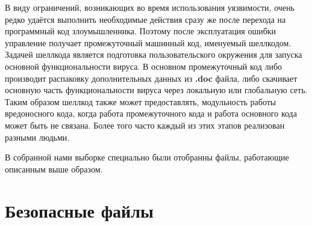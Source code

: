 В виду ограничений, возникающих во время использования уязвимости, очень редко удаётся выполнить необходимые действия сразу же после перехода на программный код злоумышленника.
Поэтому после эксплуатация ошибки управление получает промежуточный машинный код, именуемый шеллкодом.
Задачей шеллкода является подготовка пользовательского окружения для запуска основной функциональности вируса.
В основном промежуточный код либо производит распаковку дополнительных данных из \textbf{.doc} файла, либо скачивает основную часть функциональности вируса через локальную или глобальную сеть.
Таким образом шеллкод также может предоставлять, модульность работы вредоносного кода, когда работа промежуточного кода и работа основного кода может быть не связана. Более того часто каждый из этих этапов реализован разными людьми.

В собранной нами выборке специально были отобранны файлы, работающие описанным выше образом.

\section{Безопасные файлы}